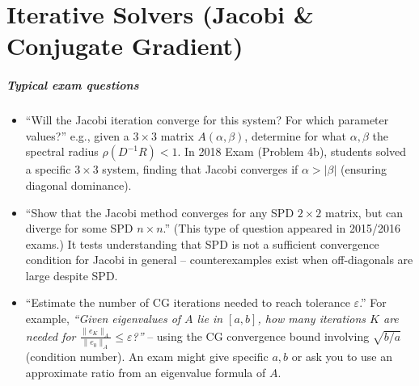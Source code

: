 \documentclass[a4paper,11pt]{report}
\begin{document}
\chapter{Iterative Solvers (Jacobi \& Conjugate Gradient)}
\paragraph{Typical exam questions}
\begin{itemize}
    \item \enquote{Will the Jacobi iteration converge for this system? For which parameter values?} e.g., given a $3\times3$ matrix $A(\alpha,\beta)$, determine for what $\alpha,\beta$ the spectral radius $\rho(D^{-1}R)<1$. In 2018 Exam (Problem 4b), students solved a specific $3\times3$ system, finding that Jacobi converges if $\alpha > |\beta|$ (ensuring diagonal dominance).
    \item \enquote{Show that the Jacobi method converges for any SPD $2\times2$ matrix, but can diverge for some SPD $n\times n$.} (This type of question appeared in 2015/2016 exams.) It tests understanding that SPD is not a sufficient convergence condition for Jacobi in general -- counterexamples exist when off-diagonals are large despite SPD.
    \item \enquote{Estimate the number of CG iterations needed to reach tolerance $\varepsilon$.} For example, \textit{``Given eigenvalues of $A$ lie in $[a,b]$, how many iterations $K$ are needed for $\frac{\|e_K\|_A}{\|e_0\|_A}\le \varepsilon$?''} -- using the CG convergence bound involving $\sqrt{b/a}$ (condition number). An exam might give specific $a,b$ or ask you to use an approximate ratio from an eigenvalue formula of $A$.
\end{itemize}
\end{document}
